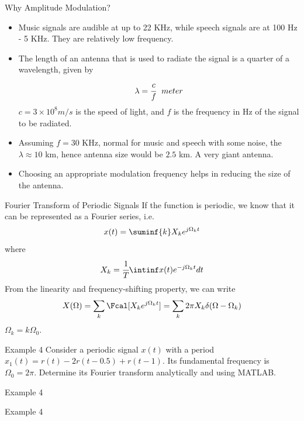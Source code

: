 \documentclass[aspectratio=169,xcolor=dvipsnames,svgnames,x11names,fleqn]{beamer}
\begin{document}
\begin{frame}{Why Amplitude Modulation?}
    \begin{itemize}
        \item Music signals are audible at up to 22 KHz, while speech signals are at 100 Hz - 5 KHz. They are relatively low frequency.
        \item The length of an antenna that is used to radiate the signal is a quarter of a wavelength, given by 
        $$
        \lambda = \cfrac{c}{f}~~ meter
        $$
        $c= 3\times 10^8 m/s$ is the speed of light, and $f$ is the frequency in Hz of the signal to be radiated. 
        \item Assuming $f = 30$ KHz, normal for music and speech with some noise, the $\lambda \approx 10$ km, hence antenna size would be $2.5$ km. A very giant antenna.
        \item Choosing an appropriate modulation frequency helps in reducing the size of the antenna.
    \end{itemize}
\end{frame}

\begin{frame}{Fourier Transform of Periodic Signals}
If the function is periodic, we know that it can be represented as a Fourier series, i.e.
$$
x(t) = \suminf{k} X_k e^{j\Omega_k t}
$$
where 
$$
X_k = \cfrac{1}{T} \intinf x(t) e^{-j\Omega_k t} dt
$$
From the linearity and frequency-shifting property, we can write
$$
X(\Omega) = \sum_k \Fcal [ X_k e^{j\Omega_k t}] = \sum_k 2\pi X_k \delta(\Omega - \Omega_k)
$$
$\Omega_k = k\Omega_0$.

\end{frame}

\begin{frame}{Example 4}
    Consider a periodic signal  $x(t)$ with a period $x_1(t) = r(t) - 2r(t-0.5) + r(t-1)$. Its fundamental frequency is $\Omega_0 = 2\pi$. Determine its Fourier transform analytically and using MATLAB.
\end{frame}

\begin{frame}{Example 4}
\vspace*{-7\baselineskip}
    \color{LightGray}{Blank space for calculation}
\end{frame}
\begin{frame}{Example 4}
\vspace*{-7\baselineskip}
    \color{LightGray}{Blank space for calculation}
\end{frame}
\end{document}
